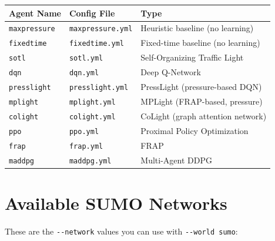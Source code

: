 \documentclass[11pt,a4paper]{article}
\begin{document}
\begin{center}
\begin{longtable}{lll}
\toprule
\textbf{Agent Name} & \textbf{Config File} & \textbf{Type} \\
\midrule
\endhead
\texttt{maxpressure}  & \texttt{maxpressure.yml}  & Heuristic baseline (no learning) \\
\texttt{fixedtime}    & \texttt{fixedtime.yml}    & Fixed-time baseline (no learning) \\
\texttt{sotl}         & \texttt{sotl.yml}         & Self-Organizing Traffic Light \\
\texttt{dqn}          & \texttt{dqn.yml}          & Deep Q-Network \\
\texttt{presslight}   & \texttt{presslight.yml}   & PressLight (pressure-based DQN) \\
\texttt{mplight}      & \texttt{mplight.yml}      & MPLight (FRAP-based, pressure) \\
\texttt{colight}      & \texttt{colight.yml}      & CoLight (graph attention network) \\
\texttt{ppo}          & \texttt{ppo.yml}          & Proximal Policy Optimization \\
\texttt{frap}         & \texttt{frap.yml}         & FRAP \\
\texttt{maddpg}       & \texttt{maddpg.yml}       & Multi-Agent DDPG \\
\bottomrule
\end{longtable}
\end{center}

\section{Available SUMO Networks}
\label{sec:networks}

These are the \texttt{-{}-network} values you can use with \texttt{-{}-world sumo}:
\end{document}
